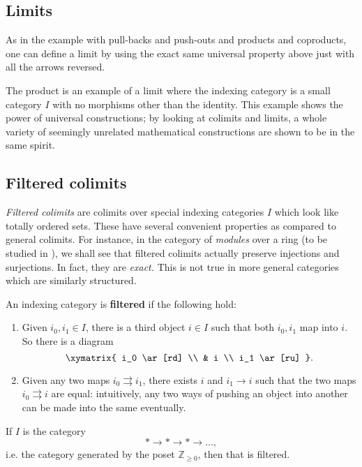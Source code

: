 \subsection{Limits}
As in the example with pull-backs and push-outs and products and coproducts,
one can define a limit by using the exact same universal property above
just with
all the arrows reversed.

\begin{example} The product is an example of a limit where the indexing
category is a small category $I$ with no morphisms other than the identity. This
example
shows the power of universal constructions; by looking at colimits and limits,
a whole variety of seemingly unrelated mathematical constructions are shown
to be
in the same spirit.
\end{example}

\subsection{Filtered colimits}


\emph{Filtered colimits} are colimits
over special indexing categories $I$ which look like totally ordered sets.
These have several convenient properties as compared to general colimits.
For instance, in the category of \emph{modules} over a ring (to be studied in
), we shall see that filtered colimits actually
preserve injections and surjections. In fact, they are \emph{exact.} This is
not true in more general categories which are similarly structured.



\begin{definition}
An indexing category is \textbf{filtered} if the following hold:
\begin{enumerate}
\item Given $i_0, i_1 \in I$, there is a third object $i \in I$ such that both
$i_0, i_1$ map into $i$.
So there is a diagram
\[ \xymatrix{
i_0 \ar[rd] \\
& i \\
i_1 \ar[ru]
}.\]
\item Given any two maps $i_0 \rightrightarrows i_1$, there exists $i$ and $i_1
\to i$ such that the two maps $i_0 \rightrightarrows i$ are equal:
intuitively, any two ways
of pushing an object into another can be made into the same eventually.
\end{enumerate}
\end{definition}

\begin{example}
If $I$ is the category
\[ \ast \to \ast \to \ast \to \dots,  \]
i.e. the category generated by the poset $\mathbb{Z}_{\geq 0}$, then that is
filtered.
\end{example}


